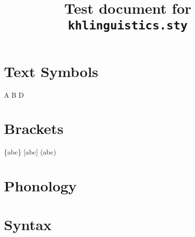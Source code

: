\documentclass{kharticle}
\title{Test document for \texttt{khlinguistics.sty}}
\begin{document}
\maketitle

\section{Text Symbols}

\begin{examplebox}
\larrow \rarrow \lrarrow \par
\emptystr \zero \par
\chkmark \xmark \par
A B \gap D \par
\end{examplebox}


\section{Brackets}

\begin{examplebox}
 \{abc\} [abc] (abc) \par
{} \par \par
{} \par
\end{examplebox}

\begin{examplebox}
\end{examplebox}


\section{Phonology}

\begin{examplebox}
 \par
{}
\end{examplebox}


\section{Syntax}

\begin{examplebox}
\emptyD \emptyT \par
\lv \lvb \lvp \par
\Tpast \Tpres
\end{examplebox}
\end{document}
